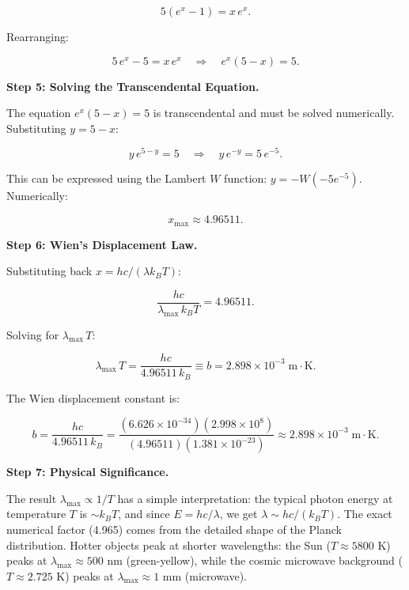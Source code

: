 \begin{equation}
5(e^x - 1) = x\,e^x.
\end{equation}

Rearranging:

\begin{equation}
5\,e^x - 5 = x\,e^x \quad \Longrightarrow \quad e^x(5 - x) = 5.
\end{equation}

\textbf{Step 5: Solving the Transcendental Equation.}

The equation $e^x(5 - x) = 5$ is transcendental and must be solved numerically. Substituting $y = 5 - x$:

\begin{equation}
y\,e^{5-y} = 5 \quad \Longrightarrow \quad y\,e^{-y} = 5\,e^{-5}.
\end{equation}

This can be expressed using the Lambert $W$ function: $y = -W(-5e^{-5})$. Numerically:

\begin{equation}
x_{\max} \approx 4.96511.
\end{equation}

\textbf{Step 6: Wien's Displacement Law.}

Substituting back $x = hc/(\lambda k_B T)$:

\begin{equation}
\frac{hc}{\lambda_{\max}\,k_B T} = 4.96511.
\end{equation}

Solving for $\lambda_{\max}\,T$:

\begin{equation}
\boxed{\lambda_{\max}\,T = \frac{hc}{4.96511\,k_B} \equiv b = 2.898 \times 10^{-3}\;\text{m}\cdot\text{K}.}
\end{equation}

The Wien displacement constant is:

\begin{equation}
b = \frac{hc}{4.96511\,k_B} = \frac{(6.626\times10^{-34})(2.998\times10^8)}{(4.96511)(1.381\times10^{-23})} \approx 2.898\times10^{-3}\;\text{m}\cdot\text{K}.
\end{equation}

\textbf{Step 7: Physical Significance.}

The result $\lambda_{\max} \propto 1/T$ has a simple interpretation: the typical photon energy at temperature $T$ is $\sim k_B T$, and since $E = hc/\lambda$, we get $\lambda \sim hc/(k_B T)$. The exact numerical factor (4.965) comes from the detailed shape of the Planck distribution. Hotter objects peak at shorter wavelengths: the Sun ($T \approx 5800$ K) peaks at $\lambda_{\max} \approx 500$ nm (green-yellow), while the cosmic microwave background ($T \approx 2.725$ K) peaks at $\lambda_{\max} \approx 1$ mm (microwave).

